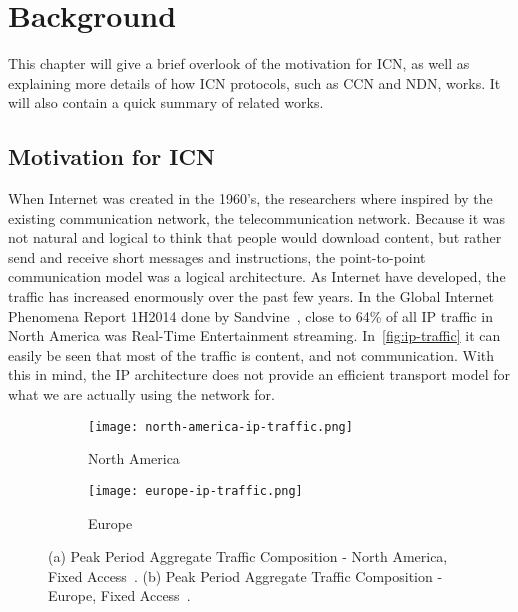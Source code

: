 \chapter{Background}\label{chp:background} 

This chapter will give a brief overlook of the motivation for \gls{ICN},
as well as explaining more details of how \gls{ICN} protocols, such as \gls{CCN} and \gls{NDN}, works. 
It will also contain a quick summary of related works.

\section{Motivation for \gls{ICN}}
When Internet was created in the 1960's, the researchers where inspired by the existing communication network, the telecommunication network.
Because it was not natural and logical to think that people would download content, but rather send and receive short messages and instructions, the point-to-point communication model was a logical architecture. 
As Internet have developed, the traffic has increased enormously over the past few years. 
In the Global Internet Phenomena Report 1H2014 done by Sandvine~\cite{gipr2014}, close to 64\% of all \gls{IP} traffic in North America was Real-Time Entertainment streaming. 
In~\autoref{fig:ip-traffic} it can easily be seen that most of the traffic is content, and not communication.
With this in mind, the \gls{IP} architecture does not provide an efficient transport model for what we are actually using the network for.

\begin{figure}[ht]
  \centering
  \begin{subfigure}{0.48\textwidth}
    \centering
    \texttt{[image: north-america-ip-traffic.png]}
    \caption{North America}
    \label{fig:north-america-ip-traffic}
  \end{subfigure}

  \begin{subfigure}{0.48\textwidth}
    \centering
    \texttt{[image: europe-ip-traffic.png]}
    \caption{Europe}
    \label{fig:europe-ip-traffic}
  \end{subfigure}
  \caption{
  (a) Peak Period Aggregate Traffic Composition - North America, Fixed Access~\cite{gipr2014}.
  (b) Peak Period Aggregate Traffic Composition - Europe, Fixed Access~\cite{gipr2014}.
  }
  \label{fig:ip-traffic}
\end{figure}

